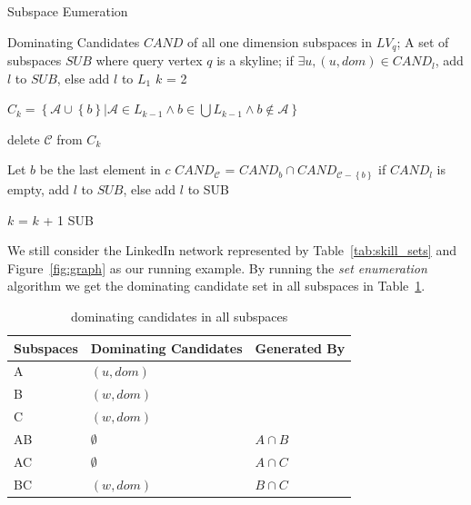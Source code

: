 \begin{algorithm}[H]
  \caption{Subspace Eumeration}\label{algo:blah}
    \begin{algorithmic}[1]
  \show\LOOP
    \REQUIRE Dominating Candidates $\mathit{CAND}$ of all one dimension subspaces in $LV_q$;
    \ENSURE A set of subspaces $SUB$ where query vertex $q$ is a skyline;
            \STATE if $\exists u, (u, dom)\in \mathit{CAND}_l$, add $l$ to $SUB$, else add $l$ to $L_1$
        \ENDFOR
        \STATE $k$ = 2
        
        
            \STATE $C_k = \left\{\mathcal{A} \cup \left\{b\right\} | \mathcal{A} \in L_{k-1} \wedge b \in \bigcup L_{k-1} \wedge b \notin \mathcal{A} \right\}$
            
                        \STATE delete $\mathcal{C}$ from $C_k$
                        
                    \ENDIF
                \ENDFOR
            \ENDFOR
            
                \STATE Let $b$ be the last element in $c$
                \STATE $CAND_\mathcal{C}$ = $CAND_b \cap CAND_{\mathcal{C}-\left\{b\right\}}$
                \STATE if $CAND_l$ is empty, add $l$ to $SUB$, else add $l$ to SUB
            \ENDFOR
            
            \STATE $k$ = $k$ + 1
        \ENDWHILE
        \RETURN SUB
  \end{algorithmic}
\end{algorithm}

We still consider the LinkedIn network represented by Table~\ref{tab:skill_sets} and Figure~\ref{fig:graph} as our running example. By running the \emph{set enumeration} algorithm we get the dominating candidate set in all subspaces in Table~\ref{tab:sub_dom_cand_pruned}.

\begin{table}[H]
    \centering
    \begin{tabular}{|l|l|l|}
    \hline
    Subspaces & Dominating Candidates & Generated By \\ \hline
    A         & $(u, dom)$  &              \\ \hline
    B         & $(w, dom)$  &              \\ \hline
    C         & $(w, dom)$  &              \\ \hline
    AB        & $\emptyset$           & $A \cap B$   \\ \hline
    AC        & $\emptyset$           & $A \cap C$   \\ \hline
    BC        & $(w, dom)$            & $B \cap C$   \\ \hline
    \end{tabular}
    \caption{\label{tab:sub_dom_cand_pruned} dominating candidates in all subspaces}
    
\end{table}

